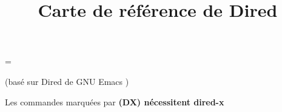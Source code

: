 \def\key#1#2{\leavevmode\hbox to \hsize{\vtop
  {\hsize=.8\hsize\rightskip=1em
  \hskip\keyindent\relax#1}\kbd{#2}\hfil}}

\newbox\metaxbox
\setbox\metaxbox\hbox{}
\newdimen\metaxwidth
\metaxwidth=\wd\metaxbox

\def\metax#1#2{\leavevmode\hbox to \hsize{\hbox to .75\hsize
  {\hskip\keyindent\relax#1\hfil}%
  \hskip -\metaxwidth minus 1fil
  \kbd{#2}\hfil}}

\def\threecol#1#2#3{\hskip\keyindent\relax#1\hfil&\kbd{#2}\hfil\quad
  &\kbd{#3}\hfil\quad\cr}

\def\dx{\bf (DX)}

\overfullrule 0pt
\nopagenumbers



\title{Carte de r\'ef\'erence de Dired}

\centerline{(bas\'e sur Dired de GNU Emacs \versionemacs)}
\centerline{Les commandes marqu\'ees par \dx{} n\'ecessitent dired-x}



